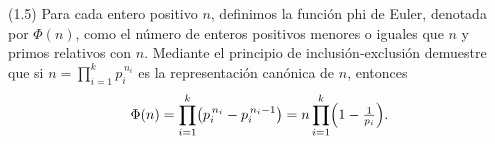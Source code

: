 (1.5) Para cada entero positivo $n$, definimos la función phi de Euler, denotada por $\Phi(n)$, como el número de enteros positivos menores o iguales que $n$ y primos relativos con $n$. Mediante el principio de inclusión‑exclusión demuestre que si $n = \prod_{i=1}^{k} p_i^{\,n_i}$ es la representación canónica de $n$, entonces
\[\Phi(n)=\prod_{i=1}^{k}\bigl(p_i^{\,n_i}-p_i^{\,n_i-1}\bigr)=n\prod_{i=1}^{k}\Bigl(1-\tfrac1{p_i}\Bigr).\]

